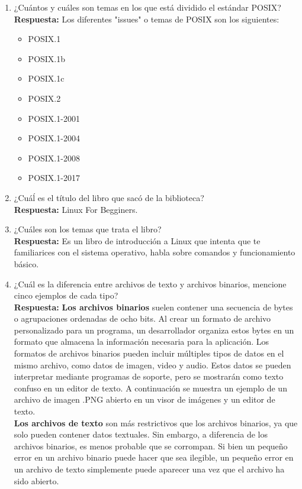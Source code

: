 \documentclass[a4paper, 11pt, oneside]{article}
\begin{document}
\begin{enumerate}
    \item ¿Cuántos y cuáles son temas en los que está dividido el estándar POSIX?\\
    \textbf{Respuesta:} Los diferentes "issues" o temas de POSIX son los siguientes:
    \begin{itemize}
        \item POSIX.1
        \item POSIX.1b
        \item POSIX.1c
        \item POSIX.2
        \item POSIX.1-2001
        \item POSIX.1-2004
        \item POSIX.1-2008
        \item POSIX.1-2017
        
    \end{itemize}
    
    \item ¿Cuáĺ es el título del libro que sacó de la biblioteca?\\
    \textbf{Respuesta:} Linux For Begginers.
    \item ¿Cuáles son los temas que trata el libro?\\
    \textbf{Respuesta:} Es un libro de introducción a Linux que intenta que te familiarices con el sistema operativo, habla sobre comandos y funcionamiento básico.
    
    
    
    \item ¿Cuál es la diferencia entre archivos de texto y archivos binarios, mencione cinco
    ejemplos de cada tipo?\\
    \textbf{Respuesta:} 
    \textbf{Los archivos binarios} suelen contener una secuencia de bytes o agrupaciones ordenadas de ocho bits. Al crear un formato de archivo personalizado para un programa, un desarrollador organiza estos bytes en un formato que almacena la información necesaria para la aplicación. Los formatos de archivos binarios pueden incluir múltiples tipos de datos en el mismo archivo, como datos de imagen, video y audio. Estos datos se pueden interpretar mediante programas de soporte, pero se mostrarán como texto confuso en un editor de texto. A continuación se muestra un ejemplo de un archivo de imagen .PNG abierto en un visor de imágenes y un editor de texto.\\
    \textbf{Los archivos de texto} son más restrictivos que los archivos binarios, ya que solo pueden contener datos textuales. Sin embargo, a diferencia de los archivos binarios, es menos probable que se corrompan. Si bien un pequeño error en un archivo binario puede hacer que sea ilegible, un pequeño error en un archivo de texto simplemente puede aparecer una vez que el archivo ha sido abierto.


\end{enumerate}
\end{document}
